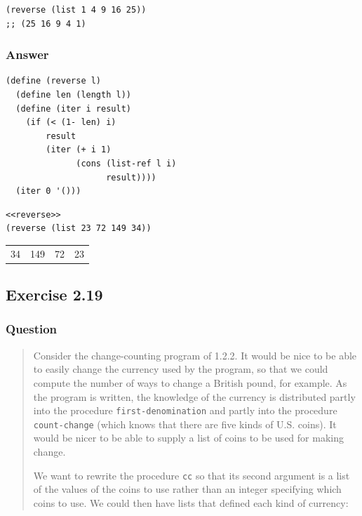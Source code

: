 \documentclass[final,fleqn,titlepage,twoside]{article}
\begin{document}
\begin{verbatim}
(reverse (list 1 4 9 16 25))
;; (25 16 9 4 1)
\end{verbatim}

\subsubsection{Answer}
\label{sec:org6fff066}
\begin{verbatim}
(define (reverse l)
  (define len (length l))
  (define (iter i result)
    (if (< (1- len) i)
        result
        (iter (+ i 1)
              (cons (list-ref l i)
                    result))))
  (iter 0 '()))
\end{verbatim}
\begin{verbatim}
<<reverse>>
(reverse (list 23 72 149 34))
\end{verbatim}

\begin{center}
\begin{tabular}{rrrr}
34 & 149 & 72 & 23\\[0pt]
\end{tabular}
\end{center}

\subsection{Exercise 2.19}
\label{sec:org1a45b8b}
\subsubsection{Question}
\label{sec:org45b07d2}
\begin{quote}
Consider the change-counting program of 1.2.2. It would be nice to be able to
easily change the currency used by the program, so that we could compute the
number of ways to change a British pound, for example. As the program is
written, the knowledge of the currency is distributed partly into the procedure
\texttt{first-denomination} and partly into the procedure
\texttt{count-change} (which knows that there are five kinds of U.S. coins).
It would be nicer to be able to supply a list of coins to be used for making
change.

We want to rewrite the procedure \texttt{cc} so that its second argument is a
list of the values of the coins to use rather than an integer specifying which
coins to use. We could then have lists that defined each kind of currency:
\end{quote}
\end{document}
